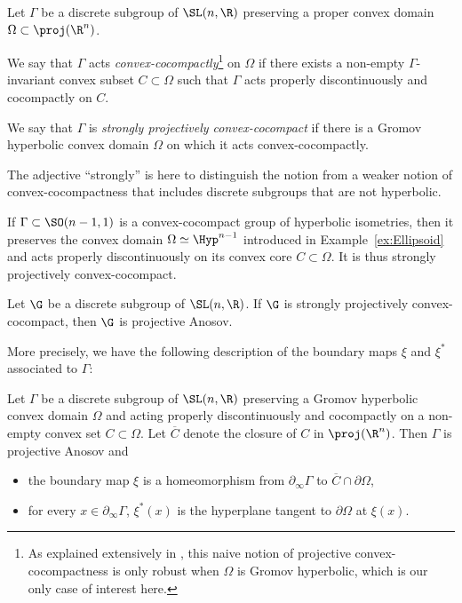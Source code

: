 \begin{defi}\label{def - convex cocompact}
Let $\Gamma$ be a discrete subgroup of $\SL(n,\R)$ preserving a proper convex domain $\Omega\subset \proj(\R^n)$.

We say that $\Gamma$ acts \emph{convex-cocompactly}\footnote{As explained extensively in \cite{DGK}, this naive notion of projective convex-cocompactness is only robust when $\Omega$ is Gromov hyperbolic, which is our only case of interest here.} on $\Omega$ if there exists a non-empty $\Gamma$\nobreakdash-in\-vari\-ant convex subset $C\subset \Omega$ such that $\Gamma$ acts properly discontinuously and cocompactly on $C$.

We say that $\Gamma$ is \emph{strongly projectively convex-cocompact} if there is a Gromov hyperbolic convex domain $\Omega$ on which it acts convex-cocompactly.
\end{defi}

\begin{rmk}
The adjective ``strongly'' is here to distinguish the notion from a weaker notion of convex-cocompactness that includes discrete subgroups that are not hyperbolic.
\end{rmk}

\begin{example}
If $\Gamma \subset \SO(n-1,1)$ is a convex-cocompact group of hyperbolic isometries, then it preserves the convex domain $\Omega \simeq \Hyp^{n-1}$ introduced in Example~\ref{ex:Ellipsoid} and acts properly discontinuously on its convex core $C \subset \Omega$. It is thus strongly projectively convex-cocompact.
\end{example}

\begin{theorem}
Let $\G$ be a discrete subgroup of $\SL(n,\R)$. If $\G$ is strongly projectively convex-cocompact, then $\G$ is projective Anosov.
\end{theorem}

More precisely, we have the following description of the boundary maps $\xi$ and $\xi^*$ associated to $\Gamma$:

\begin{theorem} \label{theo - BoundaryMapsConvexCocompact}
Let $\Gamma$ be a discrete subgroup of $\SL(n,\R)$ preserving a Gromov hyperbolic convex domain $\Omega$ and acting properly discontinuously and cocompactly on a non-empty convex set $C\subset \Omega$. Let $\overline{C}$ denote the closure of $C$ in $\proj(\R^n)$. Then $\Gamma$ is projective Anosov and
\begin{itemize}
\item the boundary map $\xi$ is a homeomorphism from $\partial_\infty \Gamma$ to $\overline{C} \cap \partial \Omega$,
\item for every $x\in \partial_\infty \Gamma$, $\xi^*(x)$ is the hyperplane tangent to $\partial \Omega$ at $\xi(x)$.
\end{itemize}
\end{theorem}

